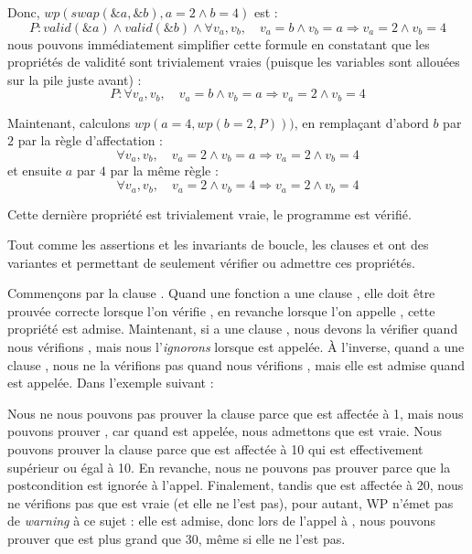Donc, $wp(swap(\&a, \&b), a = 2 \wedge b = 4)$ est :
$$P: valid(\&a) \wedge valid(\&b) \wedge \forall v_a, v_b, \quad v_a = b \wedge v_b = a \Rightarrow v_a = 2 \wedge v_b = 4$$
nous pouvons immédiatement simplifier cette formule en constatant que les propriétés
de validité sont trivialement vraies (puisque les variables sont allouées sur la pile
juste avant) :
$$P: \forall v_a, v_b, \quad v_a = b \wedge v_b = a \Rightarrow v_a = 2 \wedge v_b = 4$$


Maintenant, calculons $wp(a = 4, wp(b = 2, P)))$, en remplaçant d'abord $b$
par $2$ par la règle d'affectation :
$$\forall v_a, v_b, \quad v_a = 2 \wedge v_b = a \Rightarrow v_a = 2 \wedge v_b = 4$$
et ensuite $a$ par $4$ par la même règle :
$$\forall v_a, v_b, \quad v_a = 2 \wedge v_b = 4 \Rightarrow v_a = 2 \wedge v_b = 4$$


Cette dernière propriété est trivialement vraie, le programme est vérifié.




Tout comme les assertions et les invariants de boucle, les clauses
 et  ont des variantes
 et  permettant de seulement vérifier ou
admettre ces propriétés.


Commençons par la clause . Quand une fonction 
a une clause , elle doit être prouvée correcte lorsque l'on
vérifie , en revanche lorsque l'on appelle , cette
propriété est admise. Maintenant, si  a une clause
, nous devons la vérifier quand nous vérifions
, mais nous l'\textit{ignorons} lorsque  est appelée.
À l'inverse, quand  a une clause , nous
ne la vérifions pas quand nous vérifions , mais elle est admise
quand  est appelée. Dans l'exemple suivant :



Nous ne nous pouvons pas prouver la clause  parce que
 est affectée à 1, mais nous pouvons prouver , car
quand  est appelée, nous admettons que  est vraie.
Nous pouvons prouver la clause  parce que  est
affectée à 10 qui est effectivement supérieur ou égal à 10. En revanche, nous ne
pouvons pas prouver  parce que la postcondition est ignorée à
l'appel. Finalement, tandis que  est affectée à 20, nous ne
vérifions pas que  est vraie (et elle ne l'est pas), pour autant,
WP n'émet pas de \textit{warning} à ce sujet : elle est admise, donc lors de
l'appel à , nous pouvons prouver que  est plus grand
que 30, même si elle ne l'est pas.


